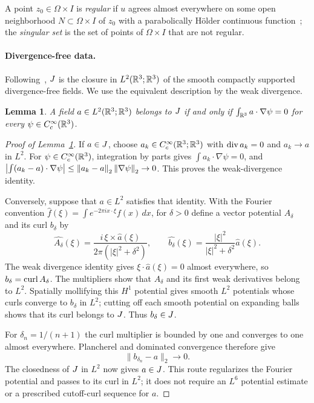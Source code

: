 \documentclass[11pt,letterpaper]{article}
\numberwithin{equation}{section}
\theoremstyle{plain}
\newtheorem{lemma}[theorem]{Lemma}
\theoremstyle{definition}
\theoremstyle{remark}
\begin{document}
A point $z_0\in\Omega\times I$ is \emph{regular} if $u$ agrees almost
everywhere on some open neighborhood $N\subset\Omega\times I$ of $z_0$ with a
parabolically H\"older continuous function~\cite[Definition~2.2]{CKNLean}; the
\emph{singular set} is the set of points of $\Omega\times I$ that are not
regular.

\paragraph{Divergence-free data.}
Following~\cite{ESS2003}, $J$ is the closure in $L^2(\mathbb{R}^3;\mathbb{R}^3)$ of the
smooth compactly supported divergence-free fields. We use the equivalent
description by the weak divergence.

\begin{lemma}\label{lem:J-weak-div}
A field $a\in L^2(\mathbb{R}^3;\mathbb{R}^3)$ belongs to $J$ if and only if
$\int_{\mathbb{R}^3}a\cdot\nabla\psi=0$ for every $\psi\in C_c^\infty(\mathbb{R}^3)$.
\end{lemma}
\begin{proof}[Proof of Lemma~\ref{lem:J-weak-div}]
If $a\in J$, choose $a_k\in C_c^\infty(\mathbb{R}^3;\mathbb{R}^3)$ with
$\operatorname{div} a_k=0$ and $a_k\to a$ in $L^2$. For $\psi\in C_c^\infty(\mathbb{R}^3)$,
integration by parts gives $\int a_k\cdot\nabla\psi=0$, and
$\left\lvert \int(a_k-a)\cdot\nabla\psi\right\rvert\le
\left\lVert a_k-a\right\rVert_2
\left\lVert \nabla\psi\right\rVert_2\to0$. This proves the weak-divergence
identity.

Conversely, suppose that $a\in L^2$ satisfies that identity. With the
Fourier convention $\widehat f(\xi)=\int e^{-2\pi i x\cdot\xi}f(x)\,dx$,
for $\delta>0$ define a vector potential $A_\delta$ and its curl $b_\delta$
by
\begin{equation}\label{eq:J-vector-potential}
 \widehat{A_\delta}(\xi)=
   \frac{i\,\xi\times\widehat a(\xi)}{2\pi(|\xi|^2+\delta^2)},
 \qquad
 \widehat{b_\delta}(\xi)=
   \frac{|\xi|^2}{|\xi|^2+\delta^2}\widehat a(\xi).
\end{equation}
The weak divergence identity gives $\xi\cdot\widehat a(\xi)=0$ almost
everywhere, so $b_\delta=\operatorname{curl} A_\delta$. The multipliers show that
$A_\delta$ and its first weak derivatives belong to $L^2$. Spatially
mollifying this $H^1$ potential gives smooth $L^2$ potentials whose curls
converge to $b_\delta$ in $L^2$; cutting off each smooth potential on
expanding balls shows that its curl belongs to $J$. Thus $b_\delta\in J$.

For $\delta_n=1/(n+1)$ the curl multiplier is bounded by one and converges
to one almost everywhere. Plancherel and dominated convergence therefore give
\begin{equation}\label{eq:J-cutoff-convergence}
 \|b_{\delta_n}-a\|_2\longrightarrow0.
\end{equation}
The closedness of $J$ in $L^2$ now gives $a\in J$. This route regularizes
the Fourier potential and passes to its curl in $L^2$; it does not require an
$L^6$ potential estimate or a prescribed cutoff-curl sequence for $a$.
\end{proof}
\end{document}
